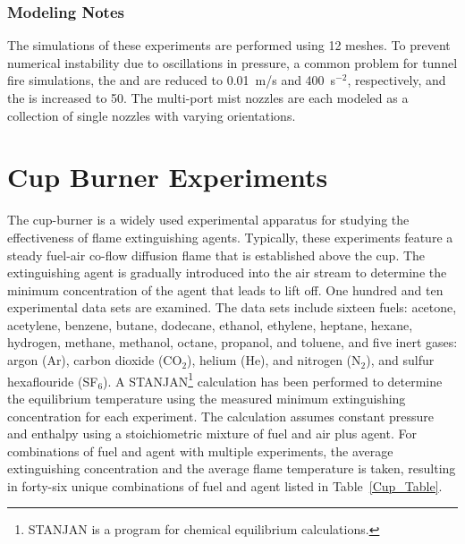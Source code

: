 \subsubsection{Modeling Notes}

The simulations of these experiments are performed using 12 meshes. To prevent numerical instability due to oscillations in pressure, a common problem for tunnel fire simulations, the  and  are reduced to 0.01~m/s and 400~s$^{-2}$, respectively, and the  is increased to 50. The multi-port mist nozzles are each modeled as a collection of single nozzles with varying orientations.



\section{Cup Burner Experiments}
\label{Cup_Burner_Description}

The cup-burner is a widely used experimental apparatus for studying the effectiveness of flame extinguishing agents. Typically, these experiments feature a steady fuel-air co-flow diffusion flame that is established above the cup. The extinguishing agent is gradually introduced into the air stream to determine the minimum concentration of the agent that leads to lift off. One hundred and ten experimental data sets are examined. The data sets include sixteen fuels: acetone, acetylene, benzene, butane, dodecane, ethanol, ethylene, heptane, hexane, hydrogen, methane, methanol, octane, propanol, and toluene, and five inert gases: argon (Ar), carbon dioxide (CO$_2$), helium (He), and nitrogen (N$_2$), and sulfur hexaflouride (SF$_6$). A STANJAN\footnote{STANJAN is a program for chemical equilibrium calculations.} calculation has been performed to determine the equilibrium temperature using the measured minimum extinguishing concentration for each experiment. The calculation assumes constant pressure and enthalpy using a stoichiometric mixture of fuel and air plus agent. For combinations of fuel and agent with multiple experiments, the average extinguishing concentration and the average flame temperature is taken, resulting in forty-six unique combinations of fuel and agent listed in Table~\ref{Cup_Table}.

